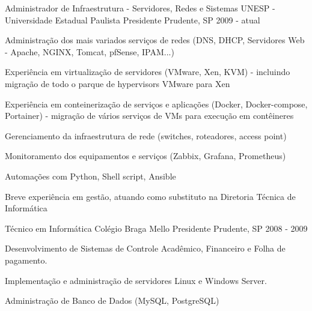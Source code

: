 

\begin{cventries}

  \cventry
    {Administrador de Infraestrutura - Servidores, Redes e Sistemas} %
    {UNESP - Universidade Estadual Paulista} %
    {Presidente Prudente, SP} %
    {2009 - atual} %
    {
      \begin{cvitems} %
        \item {Administração dos mais variados serviços de redes (DNS, DHCP, Servidores Web - Apache, NGINX, Tomcat, pfSense, IPAM...)}
        \item {Experiência em virtualização de servidores (VMware, Xen, KVM) - incluindo migração de todo o parque de hypervisors VMware para Xen}
        \item {Experiência em conteinerização de serviços e aplicações (Docker, Docker-compose, Portainer) - migração de vários serviços de VMs para execução em contêineres}
        \item {Gerenciamento da infraestrutura de rede (switches, roteadores, access point)}
        \item {Monitoramento dos equipamentos e serviços (Zabbix, Grafana, Prometheus)}
        \item {Automações com Python, Shell script, Ansible}
        \item {Breve experiência em gestão, atuando como substituto na Diretoria Técnica de Informática}
      \end{cvitems}
    }

  \cventry
    {Técnico em Informática} %
    {Colégio Braga Mello} %
    {Presidente Prudente, SP} %
    {2008 - 2009} %
    {
      \begin{cvitems} %
        \item {Desenvolvimento de Sistemas de Controle Acadêmico, Financeiro e Folha de pagamento.}
        \item {Implementação e administração de servidores Linux e Windows Server.}
        \item {Administração de Banco de Dados (MySQL, PostgreSQL)}
      \end{cvitems}
    }



\end{cventries}

